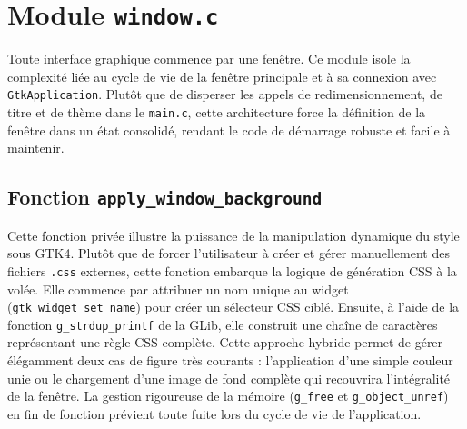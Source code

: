 \section{Module \texttt{window.c}}

Toute interface graphique commence par une fenêtre. Ce module isole la complexité liée au cycle de vie de la fenêtre principale et à sa connexion avec \texttt{GtkApplication}. Plutôt que de disperser les appels de redimensionnement, de titre et de thème dans le \texttt{main.c}, cette architecture force la définition de la fenêtre dans un état consolidé, rendant le code de démarrage robuste et facile à maintenir.

\subsection{Fonction \texttt{apply\_window\_background}}

Cette fonction privée illustre la puissance de la manipulation dynamique du style sous GTK4. Plutôt que de forcer l'utilisateur à créer et gérer manuellement des fichiers \texttt{.css} externes, cette fonction embarque la logique de génération CSS à la volée. Elle commence par attribuer un nom unique au widget (\texttt{gtk\_widget\_set\_name}) pour créer un sélecteur CSS ciblé. Ensuite, à l'aide de la fonction \texttt{g\_strdup\_printf} de la GLib, elle construit une chaîne de caractères représentant une règle CSS complète. Cette approche hybride permet de gérer élégamment deux cas de figure très courants : l'application d'une simple couleur unie ou le chargement d'une image de fond complète qui recouvrira l'intégralité de la fenêtre. La gestion rigoureuse de la mémoire (\texttt{g\_free} et \texttt{g\_object\_unref}) en fin de fonction prévient toute fuite lors du cycle de vie de l'application.

